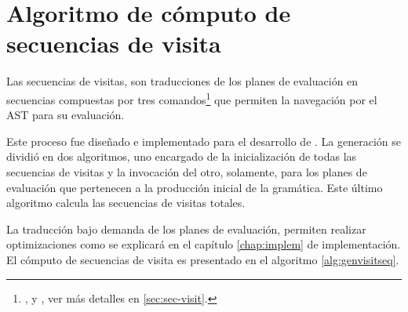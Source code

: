 




\section{Algoritmo de cómputo de secuencias de visita}
\label{sec:algseqvisit}

Las secuencias de visitas, son traducciones de los planes de evaluación en secuencias compuestas por tres comandos\footnote{,  y , ver más detalles en \ref{sec:sec-visit}.} que permiten la navegación por el AST para su evaluación.

Este proceso fue diseñado e implementado para el desarrollo de \maggen. La generación se dividió en dos algoritmos, uno encargado de la inicialización de todas las secuencias de visitas y la invocación del otro, solamente, para los planes de evaluación que pertenecen a la producción inicial de la gramática. Este último algoritmo calcula las secuencias de visitas totales.

La traducción bajo demanda de los planes de evaluación, permiten realizar optimizaciones como se explicará en el capítulo \ref{chap:implem} de implementación. El cómputo de secuencias de visita es presentado en el algoritmo \ref{alg:genvisitseq}.

